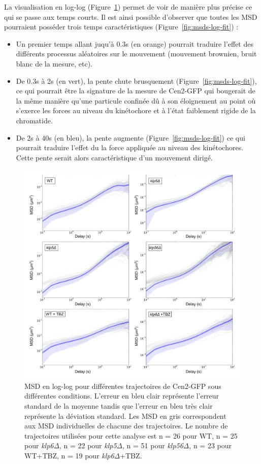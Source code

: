 \documentclass[12pt,a4paper,twoside,openright]{book}
\begin{document}
La visualisation en log-log (Figure~\ref{fig:msds-log}) permet de voir
de manière plus précise ce qui se passe aux temps courts. Il est ainsi
possible d'observer que toutes les MSD pourraient posséder trois temps
caractéristiques (Figure~\ref{fig:msds-log-fit}) :

\begin{itemize}
\item
  Un premier temps allant juqu'à 0.3s (en orange) pourrait traduire
  l'effet des différents processus aléatoires sur le mouvement
  (mouvement brownien, bruit blanc de la mesure, etc).
\item
  De 0.3s à 2s (en vert), la pente chute brusquement
  (Figure~\ref{fig:msds-log-fit}), ce qui pourrait être la signature de
  la mesure de Cen2-GFP qui bougerait de la même manière qu'une
  particule confinée dû à son éloignement au point où s'exerce les
  forces au niveau du kinétochore et à l'état faiblement rigide de la
  chromatide.
\item
  De 2s à 40s (en bleu), la pente augmente
  (Figure~\ref{fig:msds-log-fit}) ce qui pourrait traduire l'effet du la
  force appliquée au niveau des kinétochores. Cette pente serait alors
  caractéristique d'un mouvement dirigé.
\end{itemize}

\begin{figure}[htbp]
\centering
\includegraphics{figures/results/imaging/msds_log.png}
\caption[MSD en log-log pour différentes trajectoires de Cen2-GFP sous différentes conditions]{\label{fig:msds-log}MSD
en log-log pour différentes trajectoires de Cen2-GFP sous différentes
conditions. L'erreur en bleu clair représente l'erreur standard de la
moyenne tandis que l'erreur en bleu très clair représente la déviation
standard. Les MSD en gris correspondent aux MSD individuelles de chacune
des trajectoires. Le nombre de trajectoires utilisées pour cette analyse
est n = 26 pour WT, n = 25 pour \emph{klp6Δ}, n = 22 pour \emph{klp5Δ},
n = 51 pour \emph{klp56Δ}, n = 23 pour WT+TBZ, n = 19 pour
\emph{klp6Δ}+TBZ.}
\end{figure}
\end{document}
